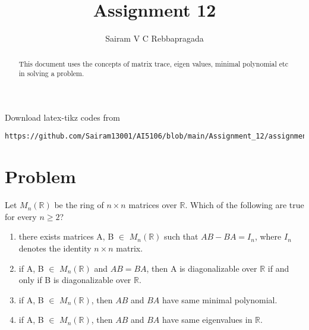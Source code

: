 \documentclass[journal,12pt,twocolumn]{IEEEtran}
\begin{document}
\makeatletter
{}
\makeatother
\let\StandardTheFigure\thefigure
\let\vec\mathbf
\renewcommand{\thefigure}{\theproblem}
\def\putbox#1#2#3{\makebox[0in][l]{\makebox[#1][l]{}\raisebox{\baselineskip}[0in][0in]{\raisebox{#2}[0in][0in]{#3}}}}
     \def\rightbox#1{\makebox[0in][r]{#1}}
     \def\centbox#1{\makebox[0in]{#1}}
     \def\topbox#1{\raisebox{-\baselineskip}[0in][0in]{#1}}
     \def\midbox#1{\raisebox{-0.5\baselineskip}[0in][0in]{#1}}
\vspace{3cm}
\title{Assignment 12}
\author{Sairam V C Rebbapragada}
\maketitle
\newpage
\bigskip
\renewcommand{\thefigure}{\theenumi}
\renewcommand{\thetable}{\theenumi}
\begin{abstract}
This document uses the concepts of matrix trace, eigen values, minimal polynomial etc in solving a problem. 
\end{abstract}

Download latex-tikz codes from 
%
\begin{lstlisting}
https://github.com/Sairam13001/AI5106/blob/main/Assignment_12/assignment_12.tex
\end{lstlisting}

\section{Problem}
Let $M_n(\mathbb{R})$ be the ring of $n \times n$ matrices over $\mathbb{R}$. Which of the following are true for every $n\geq 2$?
\begin{enumerate}
    \item there exists matrices A, B $\in$ $M_n(\mathbb{R})$ such that $AB - BA = I_n$, where $I_n$ denotes the identity $n \times n$ matrix.
    \item if A, B $\in$ $M_n(\mathbb{R})$ and $AB = BA$, then A is diagonalizable over $\mathbb{R}$ if and only if B is diagonalizable over $\mathbb{R}$.
    \item if A, B $\in$ $M_n(\mathbb{R})$, then $AB$ and $BA$ have same minimal polynomial.
    \item if A, B $\in$ $M_n(\mathbb{R})$, then $AB$ and $BA$ have same eigenvalues in $\mathbb{R}$.
\end{enumerate}
\end{document}

